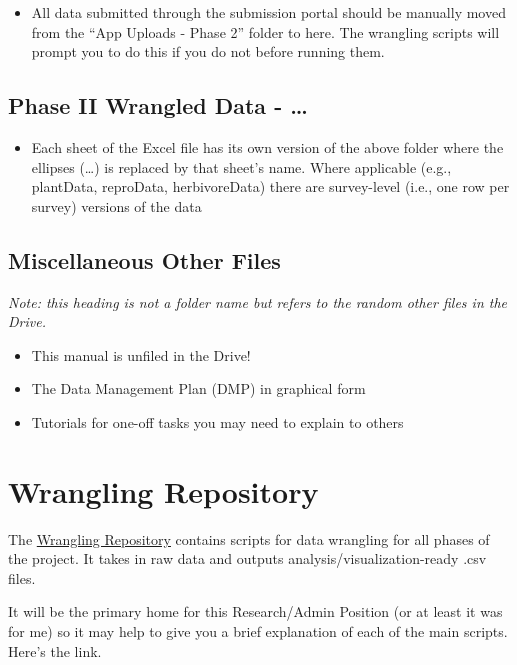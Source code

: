 \documentclass[
  letterpaper,
  DIV=11,
  numbers=noendperiod]{scrreprt}
\providecommand{\tightlist}{%
  \setlength{\itemsep}{0pt}\setlength{\parskip}{0pt}}\usepackage{longtable,booktabs,array}
\begin{document}
\begin{itemize}
\tightlist
\item
  All data submitted through the submission portal should be manually
  moved from the ``App Uploads - Phase 2'' folder to here. The wrangling
  scripts will prompt you to do this if you do not before running them.
\end{itemize}

\section{Phase II Wrangled Data -
\ldots{}}\label{phase-ii-wrangled-data--}

\begin{itemize}
\tightlist
\item
  Each sheet of the Excel file has its own version of the above folder
  where the ellipses (\ldots) is replaced by that sheet's name. Where
  applicable (e.g., plantData, reproData, herbivoreData) there are
  survey-level (i.e., one row per survey) versions of the data
\end{itemize}

\section{Miscellaneous Other Files}\label{miscellaneous-other-files}

\emph{Note: this heading is not a folder name but refers to the random
other files in the Drive.}

\begin{itemize}
\tightlist
\item
  This manual is unfiled in the Drive!
\item
  The Data Management Plan (DMP) in graphical form
\item
  Tutorials for one-off tasks you may need to explain to others
\end{itemize}

\chapter{Wrangling Repository}\label{wrangling-repository}

The \href{https://github.com/HerbVar-Network/Wrangling}{Wrangling
Repository} contains scripts for data wrangling for all phases of the
project. It takes in raw data and outputs analysis/visualization-ready
.csv files.

It will be the primary home for this Research/Admin Position (or at
least it was for me) so it may help to give you a brief explanation of
each of the main scripts. Here's the link.
\end{document}
